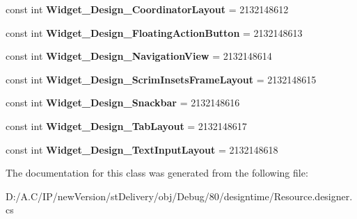 \begin{DoxyCompactItemize}
const int {\bfseries Widget\+\_\+\+Design\+\_\+\+Coordinator\+Layout} = 2132148612
\item 
\mbox{\label{classst_delivery_1_1_resource_1_1_style_a9e51def75d580bbf903eaacc9baad147}} 
const int {\bfseries Widget\+\_\+\+Design\+\_\+\+Floating\+Action\+Button} = 2132148613
\item 
\mbox{\label{classst_delivery_1_1_resource_1_1_style_a887128291c959189d923ab66ffdd5435}} 
const int {\bfseries Widget\+\_\+\+Design\+\_\+\+Navigation\+View} = 2132148614
\item 
\mbox{\label{classst_delivery_1_1_resource_1_1_style_aa76fed031e0d4f99b890b62d482c3aad}} 
const int {\bfseries Widget\+\_\+\+Design\+\_\+\+Scrim\+Insets\+Frame\+Layout} = 2132148615
\item 
\mbox{\label{classst_delivery_1_1_resource_1_1_style_af323636aa90ff7b4313decb20bcd12ef}} 
const int {\bfseries Widget\+\_\+\+Design\+\_\+\+Snackbar} = 2132148616
\item 
\mbox{\label{classst_delivery_1_1_resource_1_1_style_adb5219fcfe0abe5d29da70457bac7a47}} 
const int {\bfseries Widget\+\_\+\+Design\+\_\+\+Tab\+Layout} = 2132148617
\item 
\mbox{\label{classst_delivery_1_1_resource_1_1_style_ac4f7c75e91721e7c37e1b0a82097d71f}} 
const int {\bfseries Widget\+\_\+\+Design\+\_\+\+Text\+Input\+Layout} = 2132148618
\end{DoxyCompactItemize}


The documentation for this class was generated from the following file\+:\begin{DoxyCompactItemize}
\item 
D\+:/\+A.\+C/\+I\+P/new\+Version/st\+Delivery/obj/\+Debug/80/designtime/Resource.\+designer.\+cs\end{DoxyCompactItemize}
